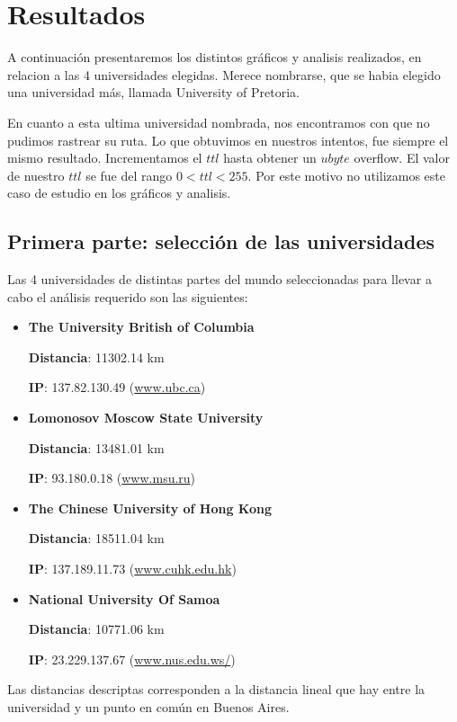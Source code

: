 \section{Resultados}	
A continuaci\'on presentaremos los distintos gr\'aficos y analisis realizados, en relacion a las 4 universidades elegidas. Merece nombrarse, que se habia elegido una universidad m\'as, llamada University of Pretoria.

En cuanto a esta ultima universidad nombrada, nos encontramos con que no pudimos rastrear su ruta. Lo que obtuvimos en nuestros intentos, fue siempre el mismo resultado. Incrementamos el $ttl$ hasta obtener un $ubyte$ overflow. El valor de nuestro $ttl$ se fue del rango $0 < ttl < 255$.
Por este motivo no utilizamos este caso de estudio en los gr\'aficos y analisis.


\subsection{Primera parte: selección de las universidades}
Las 4 universidades de distintas partes del mundo seleccionadas para llevar a cabo el análisis requerido son las siguientes: 

\begin{itemize}
 \item {\bf The University British of Columbia}
 
	{\bf Distancia}: 11302.14 km 
	
	{\bf IP}: 137.82.130.49 (\url{www.ubc.ca}{})
 
 \item {\bf Lomonosov Moscow State University}

	{\bf Distancia}: 13481.01 km
	
	{\bf IP}: 93.180.0.18 (\url{www.msu.ru}{})
 
 \item {\bf The Chinese University of Hong Kong}

	{\bf Distancia}: 18511.04 km
	
	{\bf IP}: 137.189.11.73 (\url{www.cuhk.edu.hk})
 
 \item {\bf National University Of Samoa}
 
	{\bf Distancia}: 10771.06 km
	
	{\bf IP}: 23.229.137.67 (\url{www.nus.edu.ws/}{})
 
\end{itemize}

Las distancias descriptas corresponden a la distancia lineal que hay entre la universidad y un punto en común en Buenos Aires.


